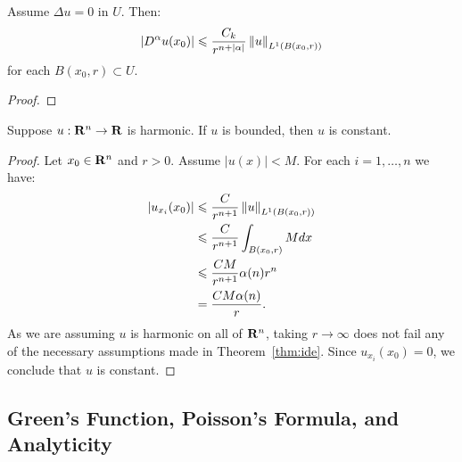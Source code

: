 \begin{theorem}
	Assume $\Delta u = 0$ in $U$. Then:
	\[
		|D^\alpha u(x_0)| \leqslant \frac{C_k}{r^{n+|\alpha|}} \left\lVert u \right\rVert_{L^1(B(x_0,r))}
	\] 
	for each $B(x_0,r) \subset U$.
\end{theorem}
	{\color{red}
	\begin{proof}
			
	\end{proof}}


\begin{corollary}[Liouville]
	Suppose $u:\mathbf{R}^n \rightarrow \mathbf{R}$ is harmonic. If $u$ is bounded, then $u$ is constant.
\end{corollary}
	\begin{proof}
		Let $x_0 \in \mathbf{R}^n$ and $r > 0$. Assume $|u(x)| < M$. For each $i=1,\ldots,n$ we have:
		\begin{align*}
			|u_{x_i}(x_0)|
			&\leqslant \frac{C}{r^{n+1}}\left\lVert u \right\rVert_{L^1(B(x_0,r))} \\
			& \leqslant \frac{C}{r^{n+1}}\int_{B(x_0,r)}^{} Mdx \\
			&\leqslant \frac{CM}{r^{n+1}}\alpha(n)r^{n} \\
			&= \frac{CM\alpha(n)}{r}.
		\end{align*}
		As we are assuming $u$ is harmonic on all of $\mathbf{R}^n$, taking $r \rightarrow \infty$ does not fail any of the necessary assumptions made in Theorem~\ref{thm:ide}. Since $u_{x_i}(x_0) = 0$, we conclude that $u$ is constant.
	\end{proof}

\subsection{Green's Function, Poisson's Formula, and Analyticity}

